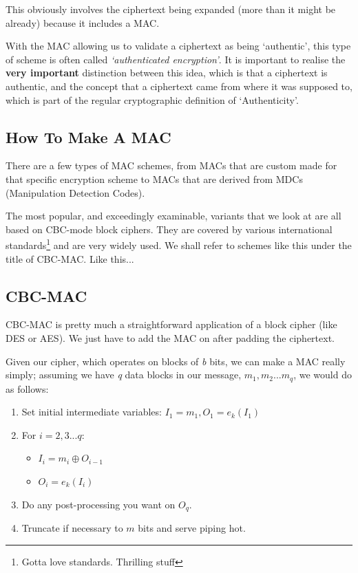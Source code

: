     This obviously involves the ciphertext being expanded (more than it might be already) because it includes a MAC. 

    With the MAC allowing us to validate a ciphertext as being `authentic', this type of scheme is often called \emph{`authenticated encryption'}.
    It is important to realise the \textbf{very important} distinction between this idea, which is that a ciphertext is authentic, and the concept that a ciphertext came from where it was supposed to, which is part of the regular cryptographic definition of `Authenticity'.

    \subsection{How To Make A MAC}
    There are a few types of MAC schemes, from MACs that are custom made for that specific encryption scheme to MACs that are derived from MDCs (Manipulation Detection Codes).

    The most popular, and exceedingly examinable, variants that we look at are all based on CBC-mode block ciphers. They are covered by various international standards\footnote{Gotta love standards. Thrilling stuff} and are very widely used. We shall refer to schemes like this under the title of CBC-MAC. Like this...

    \subsection{CBC-MAC}
    CBC-MAC is pretty much a straightforward application of a block cipher (like DES or AES). We just have to add the MAC on after padding the ciphertext.

    Given our cipher, which operates on blocks of \emph{b} bits, we can make a MAC really simply; assuming we have \emph{q} data blocks in our message, $m_{1}, m_{2}...m_{q}$, we would do as follows:
    \begin{enumerate}
        \item Set initial intermediate variables: $I_{1} = m_{1}, O_{1} = e_{k}(I_{1})$
        \item For $i = 2, 3 ... q$:
            \begin{itemize}
                \item $I_{i} = m_{i} \oplus O_{i - 1}$
                \item $O_{i} = e_{k}(I_{i})$
            \end{itemize}
        \item Do any post-processing you want on $O_{q}$.
        \item Truncate if necessary to $m$ bits and serve piping hot.
    \end{enumerate}

